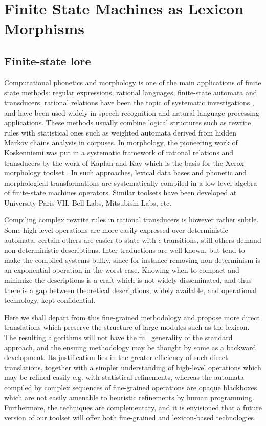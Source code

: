 \section{Finite State Machines as Lexicon Morphisms}

\subsection{Finite-state lore}

Computational phonetics and morphology is one of the main applications
of finite state methods: regular expressions, rational languages, 
finite-state automata and transducers, rational relations have been the
topic of systematic investigations \cite{mohri, rs2}, and have been used widely
in speech recognition and natural language processing applications.
These methods usually combine logical structures such as rewrite rules 
with statistical ones such as weighted automata derived from hidden Markov
chains analysis in corpuses. In morphology, the pioneering work of
Koskenniemi \cite{kosk} was put in a systematic framework of rational relations
and transducers by the work of Kaplan and Kay \cite{kk} which is the basis for
the Xerox morphology toolset \cite{karttunen1,karttunen2,beeskar}.
In such approaches, lexical data bases and phonetic and morphological
transformations are systematically compiled in a low-level algebra of 
finite-state machines operators. Similar toolsets have been developed at
University Paris VII, Bell Labs, Mitsubishi Labs, etc.

Compiling complex rewrite rules in rational transducers is however rather
subtle. Some high-level operations are more easily expressed over deterministic
automata, certain others are easier to state with $\epsilon$-transitions,
still others demand non-deterministic descriptions. Inter-traductions are
well known, but tend to make the compiled systems bulky, since for instance
removing non-determinism is an exponential operation in the worst case. 
Knowing when to compact and minimize the descriptions is a craft which is 
not widely disseminated, and thus there is a gap between theoretical
descriptions, widely available, and operational technology, kept confidential.

Here we shall depart from this fine-grained methodology and propose more
direct translations which preserve the structure of large modules such
as the lexicon. The resulting algorithms will not have the full generality
of the standard approach, and the ensuing methodology may be thought by some
as a backward development. Its justification lies in the greater efficiency
of such direct translations, together with a simpler understanding of
high-level operations which may be refined easily e.g. with statistical 
refinements, whereas the automata compiled by complex sequences of 
fine-grained operations are opaque blackboxes which are not easily
amenable to heuristic refinements by human programming. Furthermore, the
techniques are complementary, and 
it is envisioned that a future version of our %
toolset will offer both fine-grained and lexicon-based technologies. 

